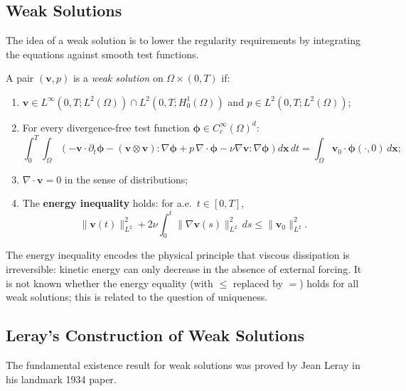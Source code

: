 \subsection{Weak Solutions}

The idea of a weak solution is to lower the regularity requirements by integrating the equations against smooth test functions.

\begin{definition}
A pair $(\mathbf{v}, p)$ is a \textit{weak solution} on $\Omega \times (0, T)$ if:
\begin{enumerate}
\item $\mathbf{v} \in L^\infty(0, T; L^2(\Omega)) \cap L^2(0, T; H^1_0(\Omega))$ and $p \in L^2(0, T; L^2(\Omega))$;
\item For every divergence-free test function $\boldsymbol{\phi} \in C_c^\infty(\Omega)^d$:
\[
\int_0^T \int_\Omega \left( -\mathbf{v} \cdot \partial_t \boldsymbol{\phi} - (\mathbf{v} \otimes \mathbf{v}) : \nabla \boldsymbol{\phi} + p \, \nabla \cdot \boldsymbol{\phi} - \nu \nabla \mathbf{v} : \nabla \boldsymbol{\phi} \right) d\mathbf{x} \, dt = \int_\Omega \mathbf{v}_0 \cdot \boldsymbol{\phi}(\cdot, 0) \, d\mathbf{x};
\]
\item $\nabla \cdot \mathbf{v} = 0$ in the sense of distributions;
\item The \textbf{energy inequality} holds: for a.e.\ $t \in [0, T]$,
\begin{equation}
\label{eq:energy-ineq}
\|\mathbf{v}(t)\|_{L^2}^2 + 2\nu \int_0^t \|\nabla \mathbf{v}(s)\|_{L^2}^2 \, ds \le \|\mathbf{v}_0\|_{L^2}^2.
\end{equation}
\end{enumerate}
\end{definition}

\begin{remark}
The energy inequality encodes the physical principle that viscous dissipation is irreversible: kinetic energy can only decrease in the absence of external forcing. It is not known whether the energy equality (with $\le$ replaced by $=$) holds for all weak solutions; this is related to the question of uniqueness.
\end{remark}

\subsection{Leray's Construction of Weak Solutions}

The fundamental existence result for weak solutions was proved by Jean Leray in his landmark 1934 paper.

